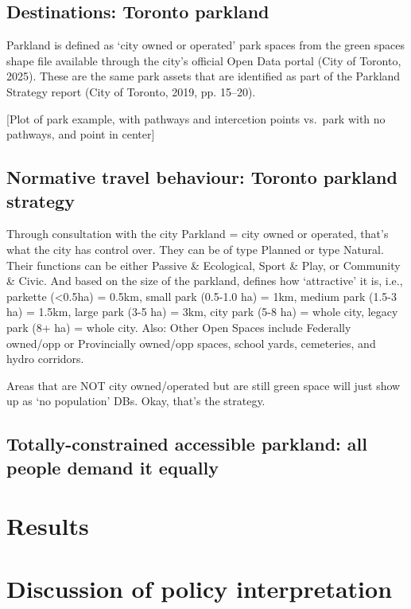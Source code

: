 \documentclass[
11pt, %
oneside, %
english, %
singlespacing, %
]{macthesis} %
\begin{document}
\subsection{Destinations: Toronto parkland}\label{destinations-toronto-parkland}

Parkland is defined as `city owned or operated' park spaces from the green spaces shape file available through the city's official Open Data portal (City of Toronto, 2025). These are the same park assets that are identified as part of the Parkland Strategy report (City of Toronto, 2019, pp. 15--20).

{[}Plot of park example, with pathways and intercetion points vs.~park with no pathways, and point in center{]}

\subsection{Normative travel behaviour: Toronto parkland strategy}\label{normative-travel-behaviour-toronto-parkland-strategy}

Through consultation with the city Parkland = city owned or operated, that's what the city has control over. They can be of type Planned or type Natural. Their functions can be either Passive \& Ecological, Sport \& Play, or Community \& Civic. And based on the size of the parkland, defines how `attractive' it is, i.e., parkette (\textless0.5ha) = 0.5km, small park (0.5-1.0 ha) = 1km, medium park (1.5-3 ha) = 1.5km, large park (3-5 ha) = 3km, city park (5-8 ha) = whole city, legacy park (8+ ha) = whole city. Also: Other Open Spaces include Federally owned/opp or Provincially owned/opp spaces, school yards, cemeteries, and hydro corridors.

Areas that are NOT city owned/operated but are still green space will just show up as `no population' DBs. Okay, that's the strategy.

\subsection{Totally-constrained accessible parkland: all people demand it equally}\label{totally-constrained-accessible-parkland-all-people-demand-it-equally}

\section{Results}\label{results}

\section{Discussion of policy interpretation}\label{discussion-of-policy-interpretation}
\end{document}
